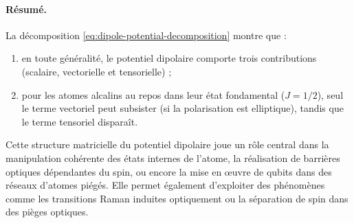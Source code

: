 \begin{itemize}[label = $\bullet$]

\end{itemize}

\paragraph{Résumé.}  
La décomposition \eqref{eq:dipole-potential-decomposition} montre que :
\begin{enumerate}[label=(\roman*)]
	\item en toute généralité, le potentiel dipolaire comporte trois contributions (scalaire, vectorielle et tensorielle) ;
	\item pour les atomes alcalins au repos dans leur état fondamental ($J=1/2$), seul le terme vectoriel peut subsister (si la polarisation est elliptique), tandis que le terme tensoriel disparaît.
\end{enumerate}

\medskip

Cette structure matricielle du potentiel dipolaire joue un rôle central dans la manipulation cohérente des états internes de l’atome, la réalisation de barrières optiques dépendantes du spin, ou encore la mise en œuvre de qubits dans des réseaux d’atomes piégés. Elle permet également d’exploiter des phénomènes comme les transitions Raman induites optiquement ou la séparation de spin dans des pièges optiques.

 
%

